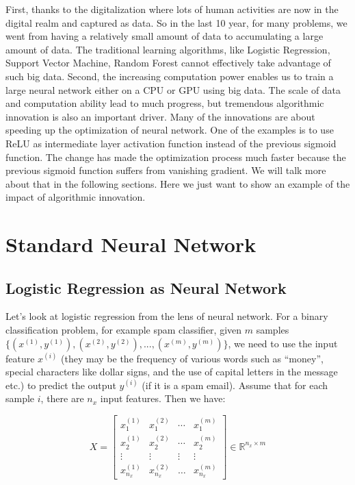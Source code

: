 \documentclass[12pt,]{krantz}
\begin{document}
First, thanks to the digitalization where lots of human activities are now in the digital realm and captured as data. So in the last 10 year, for many problems, we went from having a relatively small amount of data to accumulating a large amount of data. The traditional learning algorithms, like Logistic Regression, Support Vector Machine, Random Forest cannot effectively take advantage of such big data. Second, the increasing computation power enables us to train a large neural network either on a CPU or GPU using big data. The scale of data and computation ability lead to much progress, but tremendous algorithmic innovation is also an important driver. Many of the innovations are about speeding up the optimization of neural network. One of the examples is to use ReLU as intermediate layer activation function instead of the previous sigmoid function. The change has made the optimization process much faster because the previous sigmoid function suffers from vanishing gradient. We will talk more about that in the following sections. Here we just want to show an example of the impact of algorithmic innovation.

\hypertarget{standard-neural-network}{%
\section{Standard Neural Network}\label{standard-neural-network}}

\hypertarget{logistic_reg_as_neural_network}{%
\subsection{Logistic Regression as Neural Network}\label{logistic_reg_as_neural_network}}

Let's look at logistic regression from the lens of neural network. For a binary classification problem, for example spam classifier, given \(m\) samples \(\{(x^{(1)}, y^{(1)}),(x^{(2)}, y^{(2)}),...,(x^{(m)}, y^{(m)})\}\), we need to use the input feature \(x^{(i)}\) (they may be the frequency of various words such as ``money'', special characters like dollar signs, and the use of capital letters in the message etc.) to predict the output \(y^{(i)}\) (if it is a spam email). Assume that for each sample \(i\), there are \(n_{x}\) input features. Then we have:

\begin{equation}
X=\left[\begin{array}{cccc}
x_{1}^{(1)} & x_{1}^{(2)} & \dotsb & x_{1}^{(m)}\\
x_{2}^{(1)} & x_{2}^{(2)} & \dotsb & x_{2}^{(m)}\\
\vdots & \vdots & \vdots & \vdots\\
x_{n_{x}}^{(1)} & x_{n_{x}}^{(2)} & \dots & x_{n_{x}}^{(m)}
\end{array}\right]\in\mathbb{R}^{n_{x}\times m}
\label{eq:input}
\end{equation}
\end{document}
